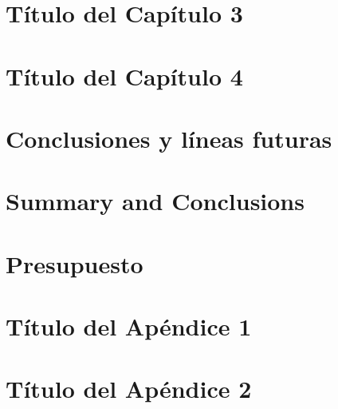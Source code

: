 \documentclass[spanish,a4paper,12pt,oneside]{extreport}
\begin{document}
\chapter{\LARGE Título del Capítulo 3}
\label{chapter:tres}



\newpage{\pagestyle{empty}}
\thispagestyle{empty}

\chapter{\LARGE Título del Capítulo 4}
\label{chapter:cuatro}



\newpage{\pagestyle{empty}}
\thispagestyle{empty}

\chapter{\LARGE Conclusiones y líneas futuras}
\label{chapter:Resultados}



\newpage{\pagestyle{empty}}
\thispagestyle{empty}

\chapter{\LARGE Summary and Conclusions}
\label{chapter:Conclusiones}



\newpage{\pagestyle{empty}}
\thispagestyle{empty}

\chapter{\LARGE Presupuesto}
\label{chapter:presupuesto}



\newpage{\pagestyle{empty}\cleardoublepage}
\thispagestyle{empty}

\begin{appendix}

\chapter{\LARGE Título del Apéndice 1}
\label{appendix:1}


\chapter{\LARGE Título del Apéndice 2}
\label{appendix:2}


\end{appendix}

\begin{thebibliography}{X}
\end{thebibliography}
\end{document}
